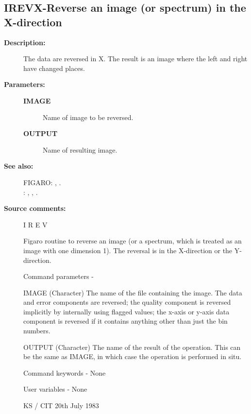 \begin{description}
\subsection{IREVX-\label{IREVX}Reverse an image (or spectrum) in the X-direction}
\begin{description}

\item [\textbf{Description:}]
 The data are reversed in X.  The result is an image where
 the left and right have changed places.

\item [\textbf{Parameters:}]
\begin{description}
\item [\textbf{IMAGE}]
 Name of image to be reversed.
\item [\textbf{OUTPUT}]
 Name of resulting image.
\end{description}

\item [\textbf{See also:}]
FIGARO: , .\\
: , , .\\

\item [\textbf{Source comments:}]
\begin{terminalv}
 I R E V

 Figaro routine to reverse an image (or a spectrum, which
 is treated as an image with one dimension 1).  The reversal
 is in the X-direction or the Y-direction.

 Command parameters -

 IMAGE    (Character) The name of the file containing the image.
          The data and error components are reversed; the quality
          component is reversed implicitly by internally using
          flagged values; the x-axis or y-axis data
          component is reversed if it contains anything other than
          just the bin numbers.

 OUTPUT   (Character) The name of the result of the operation.
          This can be the same as IMAGE, in which case the
          operation is performed in situ.

 Command keywords - None

 User variables - None

                                     KS / CIT 20th July 1983
\end{terminalv}
\end{description}

\end{description}

